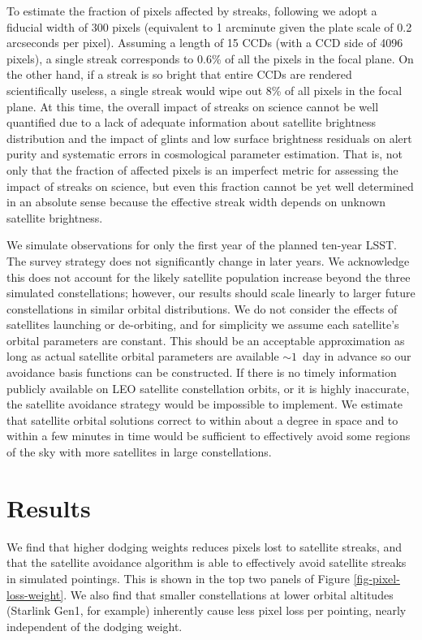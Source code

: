 \documentclass[twocolumn]{aastex631}
\begin{document}
To estimate the fraction of pixels affected by streaks, following \citet{hasan22} we adopt a fiducial width of 300 pixels (equivalent to 1 arcminute given the plate scale of 0.2 arcseconds per pixel). Assuming a length of 15 CCDs (with a CCD side of 4096 pixels), a single streak
corresponds to 0.6\% of all the pixels in the focal plane. On the other hand, if a streak
is so bright that entire CCDs are rendered scientifically useless, a single streak
would wipe out 8\% of all pixels in the focal plane. At this time, the overall impact of streaks on science cannot be well quantified due to a lack of adequate information about satellite brightness distribution and the impact of glints and low surface brightness residuals on alert purity and systematic errors in cosmological parameter estimation. 
That is, not only that the fraction of affected pixels is an imperfect metric for 
assessing the impact of streaks on science, but even this fraction cannot be yet
well determined in an absolute sense because the effective streak width depends on unknown satellite brightness. 


We simulate observations for only the first year of the planned ten-year LSST. The survey strategy does not significantly change in later years. We acknowledge this does not account for the likely satellite population increase beyond the three simulated constellations; however, our results should scale linearly to larger future constellations in similar orbital distributions. We do not consider the effects of satellites launching or de-orbiting, and for simplicity we assume each satellite's orbital parameters are constant. This should be an acceptable approximation as long as actual satellite orbital parameters are available $\sim1$\ day in advance so our avoidance basis functions can be constructed. If there is no timely information publicly available on LEO satellite constellation orbits, or it is highly inaccurate, the satellite avoidance strategy would be impossible to implement. We estimate that satellite orbital solutions correct to within about a degree in space and to within a few minutes in time would be sufficient to effectively avoid some regions of the sky with more satellites in large constellations.


\section{Results}\label{results}

We find that higher dodging weights reduces pixels lost to satellite streaks, and that the satellite avoidance algorithm is able to effectively avoid satellite streaks in simulated pointings. This is shown in the top two panels of Figure \ref{fig-pixel-loss-weight}. We also find that smaller constellations at lower orbital altitudes (Starlink Gen1, for example) inherently cause less pixel loss per pointing, nearly independent of the dodging weight.
\end{document}
